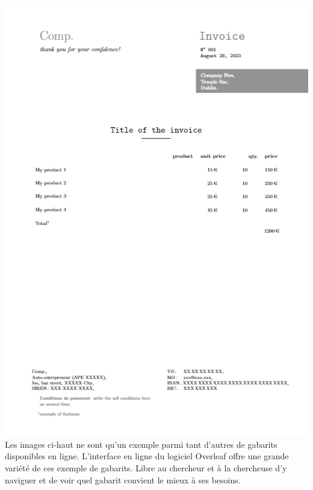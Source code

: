 \documentclass[
  letterpaper,
]{scrbook}
\begin{document}
\includegraphics{images/TStemp.png} Les images ci-haut ne sont qu'un
exemple parmi tant d'autres de gabarits disponibles en ligne.
L'interface en ligne du logiciel Overleaf offre une grande variété de
ces exemple de gabarits. Libre au chercheur et à la chercheuse d'y
naviguer et de voir quel gabarit convient le mieux à ses besoins.
\end{document}
